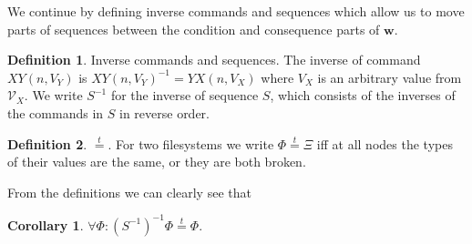 \documentclass[12pt]{article}
\newcommand{\setvx}[1]{\mathcal{V}_{#1}}
\newcommand{\FS}{\Phi} %
\newcommand{\GS}{\Xi} %
\newcommand{\fscommand}[2]{{#1#2}}
\newcommand{\cxy}{\fscommand{X}{Y}}
\newcommand{\cyx}{\fscommand{Y}{X}}
\newcommand{\workssign}{\mathbf{w}}
\newcommand{\typeeq}{\stackrel{t}{=}}
\theoremstyle{definition}
\newtheorem{mydef}{Definition}
\newtheorem{mycor}{Corollary}
\begin{document}
\medskip

We continue by defining inverse commands and sequences
which allow us to move parts of sequences between the
condition and consequence parts of $\workssign$.

\begin{mydef}{Inverse commands and sequences.}
The inverse of command $\cxy(n,V_Y)$ is $\cxy(n,V_Y)^{-1} = \cyx(n,V_X)$
where $V_X$ is an arbitrary value from $\setvx{X}$.
We write $S^{-1}$ for the inverse of sequence $S$, which consists of the inverses of the commands in $S$
in reverse order.
\end{mydef}

\begin{mydef}{$\typeeq$.}
For two filesystems we write $\FS\typeeq\GS$
iff 
at all nodes the types of their values are the same, or they are both broken.
\end{mydef}

From the definitions we can clearly see that
\begin{mycor}\label{negneg_is_typeeq}
$\forall \FS: (S^{-1})^{-1}\FS\typeeq \FS$.
\end{mycor}
\end{document}

